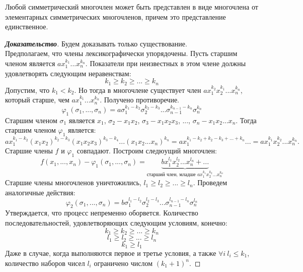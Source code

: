 \documentclass[12pt]{article}
\begin{document}
\begin{thm}
Любой симметрический многочлен может быть представлен в виде многочлена от элементарных симметрических многочленов, причем это представление единственное.
\end{thm}
\begin{proof}[\textbf{Доказательство}]
Будем доказывать только существование. \\
\indent Предполагаем, что члены лексикографически упорядочены. Пусть старшим членом является $ax_1^{k_1}...x_n^{k_n}$.
Показатели при неизвестных в этом члене должны удовлетворять следующим неравенствам:
$$k_1 \geq k_2 \geq ... \geq k_n$$
\indent Допустим, что $k_1 < k_2$. Но тогда в многочлене существует член $ax_1^{k_2}x_2^{k_1}...x_n^{k_n}$, который старше, чем $ax_1^{k_1}...x_n^{k_n}$. Получено противоречие.
$$\varphi_1(\sigma_1, ..., \sigma_n) = a\sigma_1^{k_1 - k_2}\sigma_2^{k_2 - k_3}...\sigma_{n-1}^{k_{n-1} - k_n}\sigma_n^{k_n}$$
\indent Старшим членом $\sigma_1$ является $x_1$, $\sigma_2 - x_1x_2$, $\sigma_3 - x_1x_2x_3$, ..., $\sigma_n - x_1x_2...x_n$. Тогда старшим членом $\varphi_1$ является: 
$$ax_1^{k_1-k_2}(x_1x_2)^{k_2-k_3}(x_1x_2x_3)^{k_3 - k_4}...(x_1x_2...x_n)^{k_n} = ax_1^{k_1 - k_2 + k_2 - k_3 + ... + k_n}... = ax_1^{k_1}x_2^{k_2}...x_n^{k_n}.$$
\indent Старшие члены $f$ и $\varphi_1$ совпадают. Построим следюущий многочлен:
$$f(x_1, ..., x_n) - \varphi_1(\sigma_1, ..., \sigma_n) = \underbrace{bx_1^{l_1}x_2^{l_2}...x_n^{l_n} + ...}_{\text{старший член, младше $ax_1^{k_1}x_2^{k_2}...x_n^{k_n}$}} $$
\indent Старшие члены многочленов уничтожились, $l_1 \geq l_2 \geq ... \geq l_n$. Проведем аналогичные действия:
$$\varphi_2(\sigma_1, ..., \sigma_n) = b\sigma_1^{l_1 - l_2}\sigma_2^{l_2 - l_3}...\sigma_{n-1}^{l_{n-1} - l_n}\sigma_n^{l_n}$$
\indent Утверждается, что процесс непременно оборвется. Количество последовательностей, удовлетворяющих следующим условиям, конечно:
$$k_1 \geq k_2 \geq ... \geq k_n$$
$$l_1 \geq l_2 \geq ... \geq l_n$$
$$k_1 \geq l_1$$
\indent Даже в случае, когда выполняются первое и третье условия, а также $\forall i~l_i \leq k_1$, количество наборов чисел $l_i$  ограничено числом $(k_1 + 1)^n$.
\end{proof} 
\end{document}
